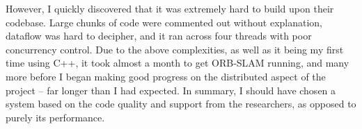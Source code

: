However, I quickly discovered that it was extremely hard to build upon their codebase. Large chunks of code were commented out without explanation, dataflow was hard to decipher, and it ran across four threads with poor concurrency control. Due to the above complexities, as well as it being my first time using C++, it took almost a month to get ORB-SLAM running, and many more before I began making good progress on the distributed aspect of the project – far longer than I had expected. In summary, I should have chosen a system based on the code quality and support from the researchers, as opposed to purely its performance.




